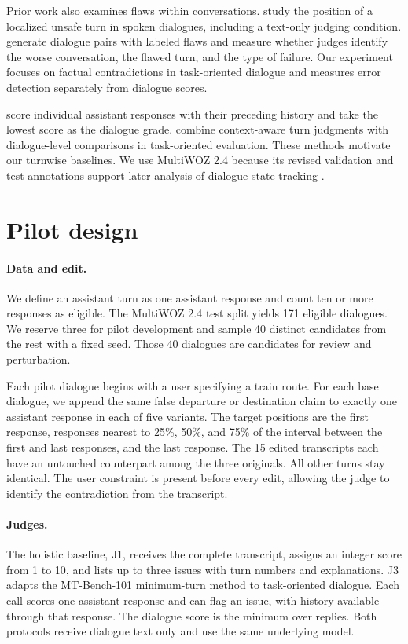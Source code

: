 \documentclass[11pt]{article}
\begin{document}
Prior work also examines flaws within conversations. \citet{ivry2026lalm} study the position of a localized unsafe turn in spoken dialogues, including a text-only judging condition. \citet{tang2026rankjudge} generate dialogue pairs with labeled flaws and measure whether judges identify the worse conversation, the flawed turn, and the type of failure. Our experiment focuses on factual contradictions in task-oriented dialogue and measures error detection separately from dialogue scores.

\citet{bai2024mtbench} score individual assistant responses with their preceding history and take the lowest score as the dialogue grade. \citet{acikgoz2025tdeval} combine context-aware turn judgments with dialogue-level comparisons in task-oriented evaluation. These methods motivate our turnwise baselines. We use MultiWOZ 2.4 because its revised validation and test annotations support later analysis of dialogue-state tracking \citep{ye2022multiwoz}.

\section{Pilot design}

\paragraph{Data and edit.}
We define an assistant turn as one assistant response and count ten or more responses as eligible. The MultiWOZ 2.4 test split yields 171 eligible dialogues. We reserve three for pilot development and sample 40 distinct candidates from the rest with a fixed seed. Those 40 dialogues are candidates for review and perturbation.

Each pilot dialogue begins with a user specifying a train route. For each base dialogue, we append the same false departure or destination claim to exactly one assistant response in each of five variants. The target positions are the first response, responses nearest to 25\%, 50\%, and 75\% of the interval between the first and last responses, and the last response. The 15 edited transcripts each have an untouched counterpart among the three originals. All other turns stay identical. The user constraint is present before every edit, allowing the judge to identify the contradiction from the transcript.

\paragraph{Judges.}
The holistic baseline, J1, receives the complete transcript, assigns an integer score from 1 to 10, and lists up to three issues with turn numbers and explanations. J3 adapts the MT-Bench-101 minimum-turn method to task-oriented dialogue. Each call scores one assistant response and can flag an issue, with history available through that response. The dialogue score is the minimum over replies. Both protocols receive dialogue text only and use the same underlying model.
\end{document}
